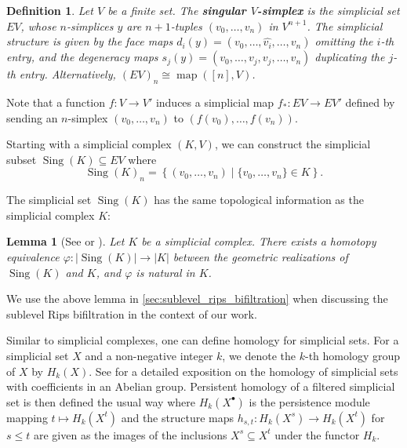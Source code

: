 \documentclass[a4paper,11pt]{article}
\newcounter{dummy}\numberwithin{dummy}{section}
\newtheorem{lemma}[dummy]{Lemma}
\newtheorem{definition}[dummy]{Definition}
\theoremstyle{remark}
\begin{document}
\begin{definition}
    \sloppy Let $V$ be a finite set. The \textbf{singular $V$-simplex} is the simplicial set $EV$, whose $n$-simplices $y$ are $n+1$-tuples $(v_0,\dots,v_n)$ in $ V^{n+1}$. The simplicial structure is given by the face maps $d_i(y)=(v_0,\dots,\widehat{v_i},\dots,v_n)$ omitting the $i$-th entry, and the degeneracy maps $s_j(y)=(v_0,\dots,v_j,v_j,\dots,v_n)$ duplicating the $j$-th entry. Alternatively, $(EV)_n\cong\operatorname{map}([n],V)$.
\end{definition}
Note that a function $f\colon V\to V'$ induces a simplicial map $f_*\colon EV\to EV'$ defined by sending an $n$-simplex $(v_0,\dots,v_n)$ to $(f(v_0),\dots,f(v_n))$.

Starting with a simplicial complex $(K,V)$, we can construct the simplicial subset $\operatorname{Sing}(K)\subseteq EV$ where
\begin{equation*}
\operatorname{Sing}(K)_n = \left\{(v_0,\ldots,v_n)\mid \{v_0,\ldots, v_n\}\in K\right\}.
\end{equation*}

The simplicial set $\operatorname{Sing}(K)$ has the same topological information as the simplicial complex $K$:
\begin{lemma}[See {\cite[Corollary~6.7]{brun2023dowker} or \cite{camarena}}]\label{lem:geometric_realizations_homotopy_equivalent}
Let $K$ be a simplicial complex. There exists a homotopy equivalence $\varphi\colon|\operatorname{Sing}(K)|\to|K|$ between the geometric realizations of $\operatorname{Sing}(K)$ and $K$, and $\varphi$ is natural in $K$.
\end{lemma}

We use the above lemma in \cref{sec:sublevel_rips_bifiltration} when discussing the sublevel Rips bifiltration in the context of our work.

Similar to simplicial complexes, one can define homology for simplicial sets. For a simplicial set $X$ and a non-negative integer $k$, we denote the $k$-th homology group of $X$ by $H_k(X)$. See \cite[Chapter~1]{goerss2009simplicial} for a detailed exposition on the homology of simplicial sets with coefficients in an Abelian group. Persistent homology of a filtered simplicial set is then defined the usual way where $H_k(X^\bullet)$ is the persistence module mapping $t\mapsto H_k(X^t)$ and the structure maps $h_{s,t}\colon H_k(X^s)\to H_k(X^t)$ for $s\leq t$ are given as the images of the inclusions $X^s\subseteq X^t$ under the functor $H_k$.
\end{document}
